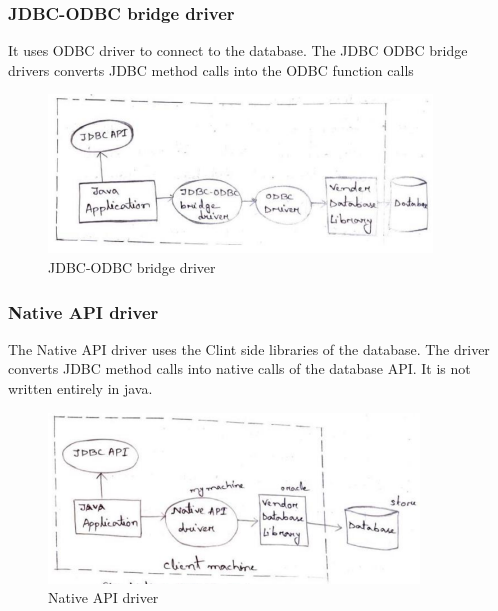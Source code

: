 \documentclass[twocolumn, a4paper]{article}
\begin{document}
\subsubsection{JDBC-ODBC bridge driver}
It uses ODBC driver to connect to the database. The JDBC ODBC bridge drivers converts JDBC method calls into the ODBC function calls
\begin{figure}[ht]
  \centering
  \includegraphics[width=\columnwidth]{jdbcodbc}
  \caption{JDBC-ODBC bridge driver}
\end{figure}

\subsubsection{Native API driver}
The Native API driver uses the Clint side libraries of the database. The driver
converts JDBC method calls into native calls of the database API. It is not
written entirely in java.
\begin{figure}[ht]
  \centering
  \includegraphics[width=\columnwidth]{jdbcnative}
  \caption{Native API driver}
\end{figure}
\end{document}
